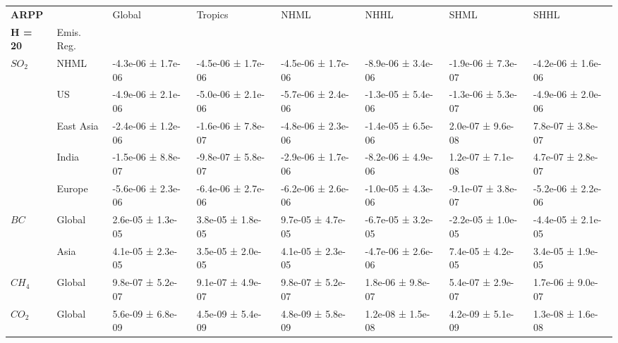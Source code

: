 \documentclass[preview]{standalone}
\newcommand{\nm}{\phantom{-}}
\begin{document}
        \tiny
        \begin{minipage}{\textwidth}
        	    	\setlength\tabcolsep{5pt}
        \begin{tabular}{llllllll}
\toprule
\textbf{ARPP}       &        &               Global &              Tropics &                 NHML &                 NHHL &                 SHML &                 SHHL \\
\textbf{H = 20} & Emis. Reg. &                      &                      &                      &                      &                      &                      \\
\midrule
$SO_2$ & NHML &  -4.3e-06 ±  1.7e-06 &  -4.5e-06 ±  1.7e-06 &  -4.5e-06 ±  1.7e-06 &  -8.9e-06 ±  3.4e-06 &  -1.9e-06 ±  7.3e-07 &  -4.2e-06 ±  1.6e-06 \\
       & US &  -4.9e-06 ±  2.1e-06 &  -5.0e-06 ±  2.1e-06 &  -5.7e-06 ±  2.4e-06 &  -1.3e-05 ±  5.4e-06 &  -1.3e-06 ±  5.3e-07 &  -4.9e-06 ±  2.0e-06 \\
       & East Asia &  -2.4e-06 ±  1.2e-06 &  -1.6e-06 ±  7.8e-07 &  -4.8e-06 ±  2.3e-06 &  -1.4e-05 ±  6.5e-06 &   \nm2.0e-07 ±  9.6e-08 &   \nm7.8e-07 ±  3.8e-07 \\
       & India &  -1.5e-06 ±  8.8e-07 &  -9.8e-07 ±  5.8e-07 &  -2.9e-06 ±  1.7e-06 &  -8.2e-06 ±  4.9e-06 &   \nm1.2e-07 ±  7.1e-08 &   \nm4.7e-07 ±  2.8e-07 \\
       & Europe &  -5.6e-06 ±  2.3e-06 &  -6.4e-06 ±  2.7e-06 &  -6.2e-06 ±  2.6e-06 &  -1.0e-05 ±  4.3e-06 &  -9.1e-07 ±  3.8e-07 &  -5.2e-06 ±  2.2e-06 \\
\cmidrule(lr){1-8}
$BC$ & Global &   \nm2.6e-05 ±  1.3e-05 &   \nm3.8e-05 ±  1.8e-05 &   \nm9.7e-05 ±  4.7e-05 &  -6.7e-05 ±  3.2e-05 &  -2.2e-05 ±  1.0e-05 &  -4.4e-05 ±  2.1e-05 \\
       & Asia &   \nm4.1e-05 ±  2.3e-05 &   \nm3.5e-05 ±  2.0e-05 &   \nm4.1e-05 ±  2.3e-05 &  -4.7e-06 ±  2.6e-06 &   \nm7.4e-05 ±  4.2e-05 &   \nm3.4e-05 ±  1.9e-05 \\
\cmidrule(lr){1-8}
$CH_4$ & Global &   \nm9.8e-07 ±  5.2e-07 &   \nm9.1e-07 ±  4.9e-07 &   \nm9.8e-07 ±  5.2e-07 &   \nm1.8e-06 ±  9.8e-07 &   \nm5.4e-07 ±  2.9e-07 &   \nm1.7e-06 ±  9.0e-07 \\
\cmidrule(lr){1-8}
$CO_2$ & Global &   \nm5.6e-09 ±  6.8e-09 &   \nm4.5e-09 ±  5.4e-09 &   \nm4.8e-09 ±  5.8e-09 &   \nm1.2e-08 ±  1.5e-08 &   \nm4.2e-09 ±  5.1e-09 &   \nm1.3e-08 ±  1.6e-08 \\
\bottomrule
\end{tabular}

        \end{minipage}
        
\end{document}
